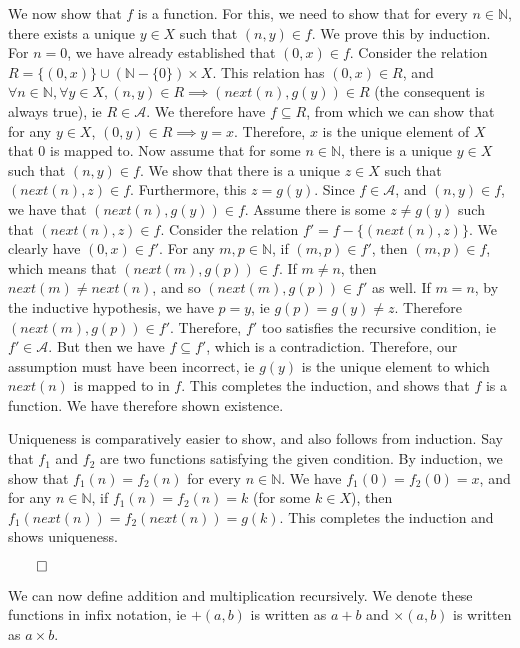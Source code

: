 \documentclass[12pt]{report}
\begin{document}
We now show that $f$ is a function. For this, we need to show that for every $n \in \mathbb{N}$, there exists a unique $y \in X$ such that $(n, y) \in f$. We prove this by induction. For $n = 0$, we have already established that $(0, x) \in f$. Consider the relation $R = \{(0, x)\} \cup (\mathbb{N} - \{0\}) \times X$. This relation has $(0, x) \in R$, and $\forall n \in \mathbb{N}, \forall y \in X, (n, y) \in R \implies (next(n), g(y)) \in R$ (the consequent is always true), ie $R \in \mathcal{A}$. We therefore have $f \subseteq R$, from which we can show that for any $y \in X$, $(0, y) \in R \implies y = x$. Therefore, $x$ is the unique element of $X$ that $0$ is mapped to. Now assume that for some $n \in \mathbb{N}$, there is a unique $y \in X$ such that $(n, y) \in f$. We show that there is a unique $z \in X$ such that $(next(n), z) \in f$. Furthermore, this $z = g(y)$. Since $f \in \mathcal{A}$, and $(n, y) \in f$, we have that $(next(n), g(y)) \in f$. Assume there is some $z \neq g(y)$ such that $(next(n), z) \in f$. Consider the relation $f' = f - \{(next(n), z)\}$. We clearly have $(0, x) \in f'$. For any $m, p \in \mathbb{N}$, if $(m, p) \in f'$, then $(m, p) \in f$, which means that $(next(m), g(p)) \in f$. If $m \neq n$, then $next(m) \neq next(n)$, and so $(next(m), g(p)) \in f'$ as well. If $m = n$, by the inductive hypothesis, we have $p = y$, ie $g(p) = g(y) \neq z$. Therefore $(next(m), g(p)) \in f'$. Therefore, $f'$ too satisfies the recursive condition, ie $f' \in \mathcal{A}$. But then we have $f \subseteq f'$, which is a contradiction. Therefore, our assumption must have been incorrect, ie $g(y)$ is the unique element to which $next(n)$ is mapped to in $f$. This completes the induction, and shows that $f$ is a function. We have therefore shown existence.

Uniqueness is comparatively easier to show, and also follows from induction. Say that $f_{1}$ and $f_{2}$ are two functions satisfying the given condition. By induction, we show that $f_{1}(n) = f_{2}(n)$ for every $n \in \mathbb{N}$. We have $f_{1}(0) = f_{2}(0) = x$, and for any $n \in \mathbb{N}$, if $f_{1}(n) = f_{2}(n) = k$ (for some $k \in X$), then $f_{1}(next(n)) = f_{2}(next(n)) = g(k)$. This completes the induction and shows uniqueness. 

$\qed$

We can now define addition and multiplication recursively. We denote these functions in infix notation, ie $+(a, b)$ is written as $a + b$ and $\times(a, b)$ is written as $a \times b$.
\end{document}
